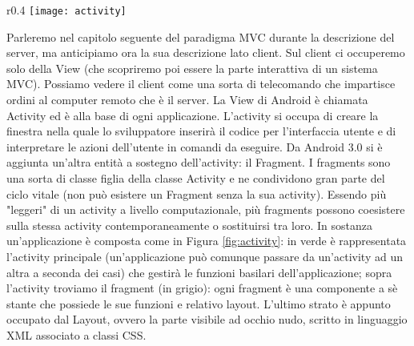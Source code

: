 \begin{wrapfigure}{r}{0.4\textwidth}
\texttt{[image: activity]}
\caption{View in Android}
\label{fig:activity}
\end{wrapfigure} 
\FloatBarrier

Parleremo nel capitolo seguente del paradigma MVC durante la descrizione del server, ma anticipiamo ora la sua descrizione lato client.
Sul client ci occuperemo solo della View (che scopriremo poi essere la parte interattiva di un sistema MVC).
Possiamo vedere il client come una sorta di telecomando che impartisce ordini al computer remoto che è il server.
La View di Android è chiamata Activity ed è alla base di ogni applicazione.
L'activity si occupa di creare la finestra nella quale lo sviluppatore inserirà il codice per l'interfaccia utente e di interpretare le azioni dell'utente in comandi da eseguire.
Da Android 3.0 si è aggiunta un'altra entità a sostegno dell'activity: il Fragment. I fragments sono una sorta di classe figlia della classe Activity e ne condividono gran parte del ciclo vitale (non può esistere un Fragment senza la sua activity). Essendo più "leggeri" di un activity a livello computazionale, più fragments possono coesistere sulla stessa activity contemporaneamente o sostituirsi tra loro.
In sostanza un'applicazione è composta come in Figura \ref{fig:activity}: in verde è rappresentata l'activity principale (un'applicazione può comunque passare da un'activity ad un altra a seconda dei casi) che gestirà le funzioni basilari dell'applicazione; sopra l'activity troviamo il fragment (in grigio): ogni fragment è una componente a sè stante che possiede le sue funzioni e relativo layout.
L'ultimo strato è appunto occupato dal Layout, ovvero la parte visibile ad occhio nudo, scritto in linguaggio XML associato a classi CSS.